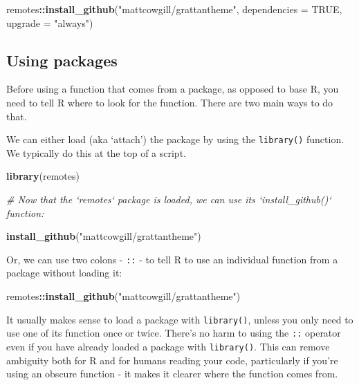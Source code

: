 \documentclass[]{book}
\newenvironment{Shaded}{\begin{snugshade}}{\end{snugshade}}
\newcommand{\CommentTok}[1]{\textcolor[rgb]{0.56,0.35,0.01}{\textit{#1}}}
\newcommand{\DataTypeTok}[1]{\textcolor[rgb]{0.13,0.29,0.53}{#1}}
\newcommand{\KeywordTok}[1]{\textcolor[rgb]{0.13,0.29,0.53}{\textbf{#1}}}
\newcommand{\NormalTok}[1]{#1}
\newcommand{\OperatorTok}[1]{\textcolor[rgb]{0.81,0.36,0.00}{\textbf{#1}}}
\newcommand{\OtherTok}[1]{\textcolor[rgb]{0.56,0.35,0.01}{#1}}
\newcommand{\StringTok}[1]{\textcolor[rgb]{0.31,0.60,0.02}{#1}}
\begin{document}
\begin{Shaded}
\begin{Highlighting}[]
\NormalTok{remotes}\OperatorTok{::}\KeywordTok{install_github}\NormalTok{(}\StringTok{"mattcowgill/grattantheme"}\NormalTok{, }\DataTypeTok{dependencies =} \OtherTok{TRUE}\NormalTok{, }\DataTypeTok{upgrade =} \StringTok{"always"}\NormalTok{)}
\end{Highlighting}
\end{Shaded}

\hypertarget{using-packages}{%
\subsection{Using packages}\label{using-packages}}

Before using a function that comes from a package, as opposed to base R, you need to tell R where to look for the function. There are two main ways to do that.

We can either load (aka `attach') the package by using the \texttt{library()} function. We typically do this at the top of a script.

\begin{Shaded}
\begin{Highlighting}[]
\KeywordTok{library}\NormalTok{(remotes)}

\CommentTok{# Now that the `remotes` package is loaded, we can use its `install_github()` function:}

\KeywordTok{install_github}\NormalTok{(}\StringTok{"mattcowgill/grattantheme"}\NormalTok{)}
\end{Highlighting}
\end{Shaded}

Or, we can use two colons - \texttt{::} - to tell R to use an individual function from a package without loading it:

\begin{Shaded}
\begin{Highlighting}[]
\NormalTok{remotes}\OperatorTok{::}\KeywordTok{install_github}\NormalTok{(}\StringTok{"mattcowgill/grattantheme"}\NormalTok{)}
\end{Highlighting}
\end{Shaded}

It usually makes sense to load a package with \texttt{library()}, unless you only need to use one of its function once or twice. There's no harm to using the \texttt{::} operator even if you have already loaded a package with \texttt{library()}. This can remove ambiguity both for R and for humans reading your code, particularly if you're using an obscure function - it makes it clearer where the function comes from.
\end{document}
